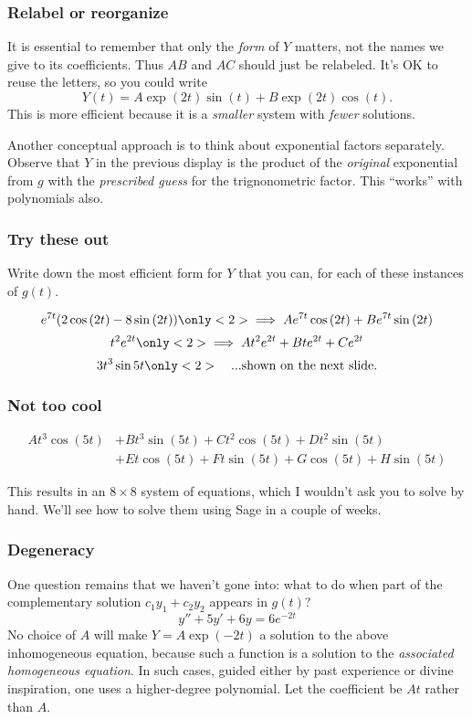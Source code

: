 \begin{frame}

\frametitle{Relabel or reorganize}
\label{relabelorreorganize}

It is essential to remember that only the \emph{form} of $ Y $ matters, not the names we give to its coefficients. Thus $ AB $ and $ AC $ should just be relabeled. It's OK to reuse the letters, so you could write
\[
    Y(t) = A \exp{(2t)} \sin{(t)} + B \exp{(2t)} \cos{(t)}.
\]
This is more efficient because it is a \emph{smaller} system with \emph{fewer} solutions.

Another conceptual approach is to think about exponential factors separately. Observe that $ Y $ in the previous display is the product of the \emph{original} exponential from $ g $ with the \emph{prescribed guess} for the trignonometric factor. This ``works'' with polynomials also. 

\end{frame}

\begin{frame}

\frametitle{Try these out}
\label{trytheseout}

Write down the most efficient form for $ Y $ that you can, for each of these instances of $ g(t) $.


\[
    e^{7t} (2 \cos{(2t)} - 8 \sin{(2t)}) \only<2>{ \implies A e^{7t} \cos{(2t)} + B e^{7t} \sin{(2t)} }
\] \[
    t^2 e^{2t} \only<2>{ \implies A t^2 e^{2t} + B t e^{2t} + C e^{2t}} 
\] \[
    3t^3 \sin{5t} \only<2>{\quad \text{...shown on the next slide.}}
\]


\end{frame}

\begin{frame}

\frametitle{Not too cool}
\label{nottoocool}


\begin{align*}
At^3 \cos{(5t)} &+ Bt^3 \sin{(5t)} + Ct^2 \cos{(5t)} + Dt^2 \sin{(5t)} \\ 
&+ Et \cos{(5t)} + Ft \sin{(5t)} + G \cos{(5t)} + H \sin{(5t)}
\end{align*}


This results in an $ 8 \times 8 $ system of equations, which I wouldn't ask you to solve by hand. We'll see how to solve them using Sage in a couple of weeks.

\end{frame}

\begin{frame}

\frametitle{Degeneracy}
\label{degeneracy}

One question remains that we haven't gone into: what to do when part of the complementary solution $ c_1 y_1 + c_2 y_2 $ appears in $ g(t) $?
\[
    y'' + 5y' + 6y = 6e^{-2t}
\]
No choice of $ A $ will make $ Y = A \exp{(-2t)} $ a solution to the above inhomogeneous equation, because such a function is a solution to the \emph{associated homogeneous equation}. In such cases, guided either by past experience or divine inspiration, one uses a higher-degree polynomial. Let the coefficient be $ At $ rather than $ A $.

\end{frame}

